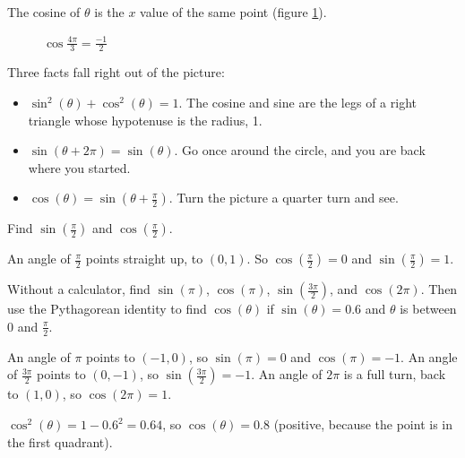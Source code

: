 The cosine of $\theta$ is the $x$ value of the same point
(figure \ref{fig:cosine}).

\begin{figure}
\centering
{}
\caption{$\cos{\frac{4\pi}{3}} = \frac{-1}{2}$}
\label{fig:cosine}
\end{figure}

Three facts fall right out of the picture:
\begin{itemize}
\item {}$\sin^2(\theta) + \cos^2(\theta) = 1$.
      The cosine and sine are the legs of a right triangle whose hypotenuse
      is the radius, 1.
\item $\sin(\theta + 2\pi) = \sin(\theta)$. Go once around the circle, and
      you are back where you started.
\item $\cos(\theta) = \sin(\theta + \frac{\pi}{2})$. Turn the picture a
      quarter turn and see.
\end{itemize}

\begin{Worked}
\begin{Problem}
Find $\sin(\frac{\pi}{2})$ and
$\cos(\frac{\pi}{2})$.
\end{Problem}
\begin{Solution}
An angle of $\frac{\pi}{2}$ points straight up, to
$(0, 1)$. So $\cos(\frac{\pi}{2}) = 0$ and $\sin(\frac{\pi}{2}) = 1$.
\end{Solution}
\end{Worked}

\begin{Exercise}[title={Around the circle}, label=trig_unit_circle]
Without a calculator, find $\sin(\pi)$, $\cos(\pi)$, $\sin(\frac{3\pi}{2})$,
and $\cos(2\pi)$. Then use the Pythagorean identity to find
$\cos(\theta)$ if $\sin(\theta) = 0.6$ and $\theta$ is between 0 and
$\frac{\pi}{2}$.
\end{Exercise}
\begin{Answer}[ref=trig_unit_circle]
An angle of $\pi$ points to $(-1, 0)$, so $\sin(\pi) = 0$ and
$\cos(\pi) = -1$. An angle of $\frac{3\pi}{2}$ points to $(0, -1)$, so
$\sin(\frac{3\pi}{2}) = -1$. An angle of $2\pi$ is a full turn, back to
$(1, 0)$, so $\cos(2\pi) = 1$.

$\cos^2(\theta) = 1 - 0.6^2 = 0.64$, so $\cos(\theta) = 0.8$ (positive,
because the point is in the first quadrant).
\end{Answer}


